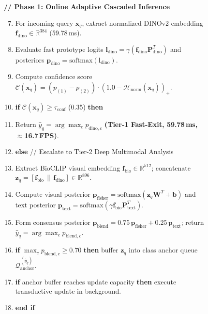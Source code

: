 \documentclass[preprint,12pt]{elsarticle}
\newcounter{algocounter}
\begin{document}
\begin{figure}[htbp]
{\begin{minipage}{0.95\textwidth}
\vspace{2pt}
\textbf{// Phase 1: Online Adaptive Cascaded Inference}
\begin{enumerate}
    \setcounter{enumi}{6}
    \setlength{\itemsep}{1pt}
    \item For incoming query $\mathbf{x}_q$, extract normalized DINOv2 embedding $\mathbf{f}_{\text{dino}} \in \mathbb{R}^{384}$ (59.78\,ms).
    \item Evaluate fast prototype logits $\mathbf{l}_{\text{dino}} = \gamma (\mathbf{f}_{\text{dino}}\mathbf{P}_{\text{dino}}^T)$ and posteriors $\mathbf{p}_{\text{dino}} = \text{softmax}(\mathbf{l}_{\text{dino}})$.
    \item Compute confidence score $\mathcal{C}(\mathbf{x}_q) = (p_{(1)} - p_{(2)}) \cdot (1.0 - \mathcal{H}_{\text{norm}}(\mathbf{x}_q))_+$.
    \item \textbf{if} $\mathcal{C}(\mathbf{x}_q) \ge \tau_{\text{conf}}$ (0.35) \textbf{then}
    \item \quad Return $\hat{y}_q = \arg\max_c p_{\text{dino}, c}$ \textbf{(Tier-1 Fast-Exit, 59.78\,ms, $\approx$16.7\,FPS)}.
    \item \textbf{else} // Escalate to Tier-2 Deep Multimodal Analysis
    \item \quad Extract BioCLIP visual embedding $\mathbf{f}_{\text{bio}} \in \mathbb{R}^{512}$; concatenate $\mathbf{z}_q = [\mathbf{f}_{\text{bio}} \,\|\, \mathbf{f}_{\text{dino}}] \in \mathbb{R}^{896}$.
    \item \quad Compute visual posterior $\mathbf{p}_{\text{fisher}} = \text{softmax}(\mathbf{z}_q \mathbf{W}^T + \mathbf{b})$ and text posterior $\mathbf{p}_{\text{text}} = \text{softmax}(\gamma \mathbf{f}_{\text{bio}}\mathbf{P}_{\text{text}}^T)$.
    \item \quad Form consensus posterior $\mathbf{p}_{\text{blend}} = 0.75 \, \mathbf{p}_{\text{fisher}} + 0.25 \, \mathbf{p}_{\text{text}}$; return $\hat{y}_q = \arg\max_c p_{\text{blend}, c}$.
    \item \quad \textbf{if} $\max_c p_{\text{blend}, c} \ge 0.70$ \textbf{then} buffer $\mathbf{z}_q$ into class anchor queue $\mathcal{Q}_{\text{anchor}}^{(\hat{y}_q)}$.
    \item \quad \textbf{if} anchor buffer reaches update capacity \textbf{then} execute transductive update in background.
    \item \textbf{end if}
\end{enumerate}
\vspace{2pt}
\end{minipage}
}
\label{alg:biodino}
\end{figure}
\end{document}
